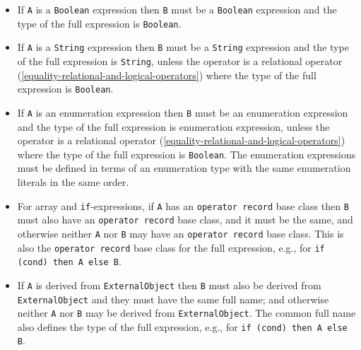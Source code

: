 \begin{itemize}
  If \lstinline!A! is an \lstinline!Integer! expression:
  \begin{itemize}
  \item
    In simple equality equations with non-trivial  and assignment statements, and where \lstinline!A! is part of the left-hand side and \lstinline!B! the corresponding part of the right-hand side, \lstinline!B! must be an \lstinline!Integer! expression.
  \item
    Otherwise \lstinline!B! must be a \lstinline!Real! or \lstinline!Integer! expression.
    For exponentiation and division the type of the full expression is \lstinline!Real! (even if both \lstinline!A! and \lstinline!B! are \lstinline!Integer!) see \cref{element-wise-exponentiation} and \cref{division-by-numeric-scalars}, for relational operators the type of the full expression is \lstinline!Boolean!.
    In other cases the type of the full expression is \lstinline!Real! or \lstinline!Integer! (same as \lstinline!B!), compare \cref{standard-type-coercion}.
  \end{itemize}
\item
  If \lstinline!A! is a \lstinline!Boolean! expression then \lstinline!B! must be a \lstinline!Boolean! expression and the type of the full expression is \lstinline!Boolean!.
\item
  If \lstinline!A! is a \lstinline!String! expression then \lstinline!B! must be a \lstinline!String! expression and the type of the full expression is \lstinline!String!, unless the operator is a relational operator (\cref{equality-relational-and-logical-operators}) where the type of the full expression is \lstinline!Boolean!.
\item
  If \lstinline!A! is an enumeration expression then \lstinline!B! must be an enumeration expression and the type of the full expression is enumeration expression, unless the operator is a relational operator (\cref{equality-relational-and-logical-operators}) where the type of the full expression is \lstinline!Boolean!.
  The enumeration expressions must be defined in terms of an enumeration type with the same enumeration literals in the same order.
\item
  For array and \lstinline!if!-expressions, if \lstinline!A! has an \lstinline!operator record! base class then \lstinline!B! must also have an \lstinline!operator record! base class, and it must be the same, and otherwise neither \lstinline!A! nor \lstinline!B! may have an \lstinline!operator record! base class.
  This is also the \lstinline!operator record! base class for the full expression, e.g., for \lstinline!if (cond) then A else B!.
\item
  If \lstinline!A! is derived from \lstinline!ExternalObject! then \lstinline!B! must also be derived from \lstinline!ExternalObject! and they must have the same full name; and otherwise neither \lstinline!A! nor \lstinline!B! may be derived from \lstinline!ExternalObject!.
  The common full name also defines the type of the full expression, e.g., for \lstinline!if (cond) then A else B!.
\end{itemize}
